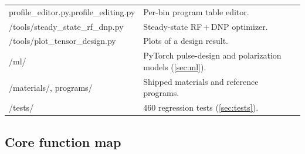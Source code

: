 \documentclass[11pt]{article}
\begin{document}
\begin{center}
\begin{tabularx}{0.96\textwidth}{>{\ttfamily}L{0.33\textwidth} X}
profile\_editor.py,\newline profile\_editing.py & Per-bin program table editor.\\
/tools/steady\_state\_rf\_dnp.py & Steady-state RF\,+\,DNP optimizer.\\
/tools/plot\_tensor\_design.py & Plots of a design result.\\
/ml/ & PyTorch pulse-design and polarization models (\cref{sec:ml}).\\
/materials/, programs/ & Shipped materials and reference programs.\\
/tests/ & 460 regression tests (\cref{sec:tests}).\\
\bottomrule
\end{tabularx}
\end{center}

\subsection{Core function map}
\end{document}
